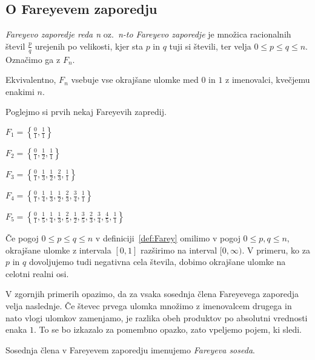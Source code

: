 \documentclass[mat1]{fmfdelo}
\begin{document}
%
\subsection{O Fareyevem zaporedju}

\begin{definicija}
\label{def:Farey}
\emph{Fareyevo zaporedje reda n} oz.\ \emph{n-to Fareyevo zaporedje} je množica racionalnih števil $\frac{p}{q}$ urejenih po velikosti, kjer sta $p$ in $q$ tuji si števili, ter velja $0 \leq p \leq q \leq n$. Označimo ga z $F_n$.

Ekvivalentno, $F_n$ vsebuje vse okrajšane ulomke med $0$ in $1$ z imenovalci, kvečjemu enakimi $n$.
\end{definicija}

\begin{primer}
Poglejmo si prvih nekaj Fareyevih zapredij.

\(F_1 = \left \{\frac{0}{1}, \frac{1}{1} \right \} \)

\(F_2 = \left \{\frac{0}{1}, \frac{1}{2}, \frac{1}{1} \right \} \)

\(F_3 = \left \{\frac{0}{1}, \frac{1}{3}, \frac{1}{2}, \frac{2}{3}, \frac{1}{1} \right \} \)

\(F_4 = \left \{\frac{0}{1}, \frac{1}{4}, \frac{1}{3}, \frac{1}{2}, \frac{2}{3}, \frac{3}{4}, \frac{1}{1} \right \} \)

\(F_5 = \left \{\frac{0}{1}, \frac{1}{5}, \frac{1}{4}, \frac{1}{3}, \frac{2}{5}, \frac{1}{2}, \frac{3}{5}, \frac{2}{3}, \frac{3}{4}, \frac{4}{5}, \frac{1}{1}\right \} \)
\end{primer}

\begin{opomba}
Če pogoj $0 \leq p \leq q \leq n$ v definiciji~\ref{def:Farey} omilimo v pogoj $0 \leq p,q \leq n$, okrajšane ulomke z intervala $[0,1]$ razširimo na interval $[0, \infty)$. V primeru, ko za $p$ in $q$ dovoljujemo tudi negativna cela števila, dobimo okrajšane ulomke na celotni realni osi.
\end{opomba}

V zgornjih primerih opazimo, da za vsaka sosednja člena Fareyevega zaporedja velja naslednje. Če števec prvega ulomka množimo z imenovalcem drugega in nato vlogi ulomkov zamenjamo, je razlika obeh produktov po absolutni vrednosti enaka $1$. To se bo izkazalo za pomembno opazko, zato vpeljemo pojem, ki sledi.

\begin{definicija}
Sosednja člena v Fareyevem zaporedju imenujemo \emph{Fareyeva soseda}.
\end{definicija}
\end{document}
